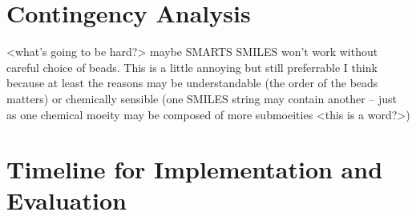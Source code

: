 \section*{Contingency Analysis}

<what's going to be hard?> 
maybe SMARTS SMILES won't work without careful choice of beads. This is a little annoying but still preferrable I think because at least the reasons may be understandable (the order of the beads matters) or chemically sensible (one SMILES string may contain another -- just as one chemical moeity may be composed of more submoeities <this is a word?>)

\section*{Timeline for Implementation and Evaluation}
